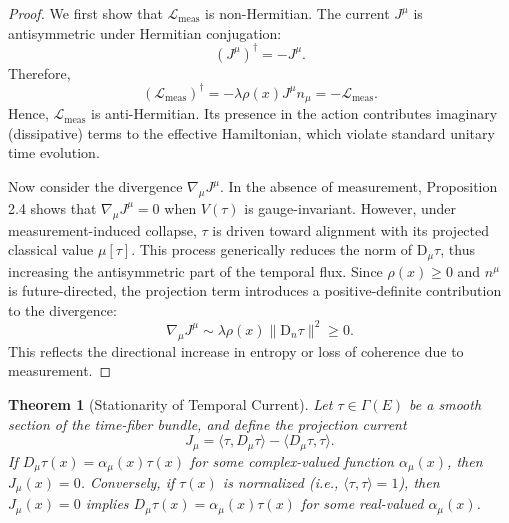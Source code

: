 \documentclass[11pt]{article}
\newtheorem{theorem}{Theorem}
\begin{document}
\begin{proof}
We first show that $\mathcal{L}_{\mathrm{meas}}$ is non-Hermitian. The current $J^\mu$ is antisymmetric under Hermitian conjugation:
\[
(J^\mu)^\dagger = -J^\mu.
\]
Therefore,
\[
(\mathcal{L}_{\mathrm{meas}})^\dagger = -\lambda \rho(x) J^\mu n_\mu = -\mathcal{L}_{\mathrm{meas}}.
\]
Hence, $\mathcal{L}_{\mathrm{meas}}$ is anti-Hermitian. Its presence in the action contributes imaginary (dissipative) terms to the effective Hamiltonian, which violate standard unitary time evolution.

Now consider the divergence $\nabla_\mu J^\mu$. In the absence of measurement, Proposition 2.4 shows that $\nabla_\mu J^\mu = 0$ when $V(\tau)$ is gauge-invariant. However, under measurement-induced collapse, $\tau$ is driven toward alignment with its projected classical value $\mu[\tau]$. This process generically reduces the norm of $\mathrm{D}_\mu \tau$, thus increasing the antisymmetric part of the temporal flux. Since $\rho(x) \geq 0$ and $n^\mu$ is future-directed, the projection term introduces a positive-definite contribution to the divergence:
\[
\nabla_\mu J^\mu \sim \lambda \rho(x) \| \mathrm{D}_{n} \tau \|^2 \geq 0.
\]
This reflects the directional increase in entropy or loss of coherence due to measurement.
\end{proof}

\begin{theorem}[Stationarity of Temporal Current]
Let \( \tau \in \Gamma(E) \) be a smooth section of the time-fiber bundle, and define the projection current
\[
J_\mu = \langle \tau, D_\mu \tau \rangle - \langle D_\mu \tau, \tau \rangle.
\]
If \( D_\mu \tau(x) = \alpha_\mu(x) \tau(x) \) for some complex-valued function \( \alpha_\mu(x) \), then \( J_\mu(x) = 0 \). Conversely, if \( \tau(x) \) is normalized (i.e., \( \langle \tau, \tau \rangle = 1 \)), then \( J_\mu(x) = 0 \) implies \( D_\mu \tau(x) = \alpha_\mu(x) \tau(x) \) for some real-valued \( \alpha_\mu(x) \).
\end{theorem}
\end{document}
